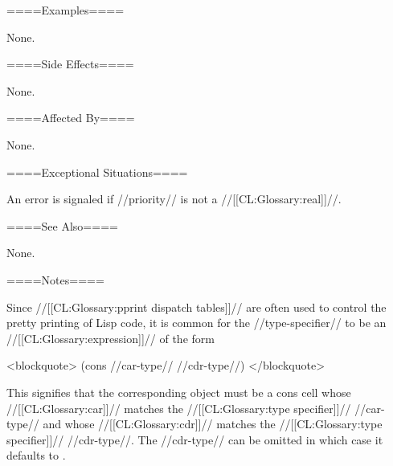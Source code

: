 ====Examples====

None.

====Side Effects====

None.

====Affected By====

None.

====Exceptional Situations====

An error is signaled if //priority// is not a //[[CL:Glossary:real]]//.

====See Also====

None.

====Notes====

Since //[[CL:Glossary:pprint dispatch tables]]// are often used to control the pretty printing of Lisp code, it is common for the //type-specifier// to be an //[[CL:Glossary:expression]]// of the form

<blockquote> (cons //car-type// //cdr-type//) </blockquote>

This signifies that the corresponding object must be a cons cell whose //[[CL:Glossary:car]]// matches the //[[CL:Glossary:type specifier]]// //car-type// and whose //[[CL:Glossary:cdr]]// matches the //[[CL:Glossary:type specifier]]// //cdr-type//. The //cdr-type// can be omitted in which case it defaults to .

